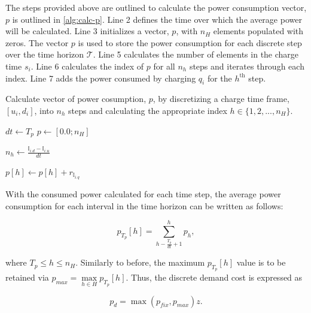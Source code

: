 \documentclass[11pt,a4paper,final]{article}
\newcommand{\T}{\mathcal{T}}                %
\newcommand{\I}{\mathbb{I}}                 %
\begin{document}
The steps provided above are outlined to calculate the power consumption vector, \(p\) is outlined in \ref{alg:calc-p}.
Line 2 defines the time over which the average power will be calculated. Line 3 initializes a vector, \(p\), with \(n_H\)
elements populated with zeros. The vector \(p\) is used to store the power consumption for each discrete step over the
time horizon \(\T\). Line 5 calculates the number of elements in the charge time \(s_i\). Line 6 calculates the index of \(p\)
for all \(n_h\) steps and iterates through each index. Line 7 adds the power consumed by charging \(q_i\) for the
\(h^{\text{th}}\) step.

\begin{algorithm}[H]
  \caption{Calculate vector of power cosumption, $p$, by discretizing a charge time frame, $[u_i, d_i]$, into $n_h$ steps and calculating the appropriate index $h \in \{1,2,...,n_H\}$.} \label{alg:calc-p}
  \LinesNumbered
  \KwIn{$(\I, r)$}

  \Begin
    {
      $dt \leftarrow T_p$
      $p \leftarrow [0.0; n_H]$

      \ForEach {$\I_i \in \I$}
      {
        $n_h \leftarrow \frac{\I_{i.d} - \I_{i.u}}{dt}$

        {
          $p[h] \leftarrow p[h] + r_{\I_{i.q}}$
        }
      }
    }
\end{algorithm}

With the consumed power calculated for each time step, the average power consumption for each interval in the time
horizon can be written as follows:

\begin{equation}
p_{T_p}[h] = \sum_{h-\frac{T_p}{dt}+1}^h p_h,
\end{equation}

where \(T_p \le h \le n_H\). Similarly to before, the maximum \(p_{T_p}[h]\) value is to be retained via \(p_{max} =
\max\limits_{h \in H}p_{T_p}[h]\). Thus, the discrete demand cost is expressed as

\begin{equation}
\label{eq:pd-dis}
  p_d = \max(p_{fix}, p_{max})z\text{.}
\end{equation}
\end{document}
